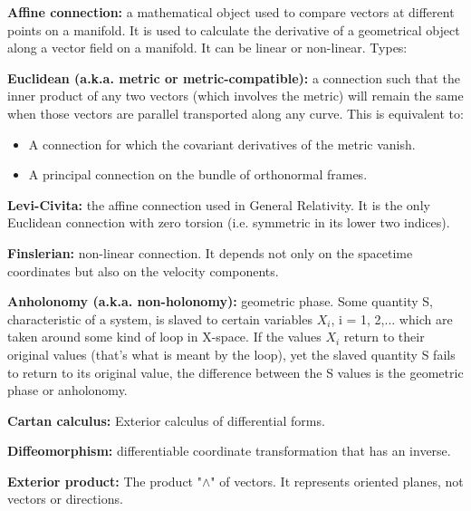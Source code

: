 \begin{list}{}{}
	\item \textbf{Affine connection:} a mathematical object used to compare vectors at different points on a manifold. It is used to calculate the derivative of a geometrical object along a vector field on a manifold. It can be linear or non-linear. Types:
	\begin{list}{}{}
		\item \textbf{Euclidean (a.k.a. metric or metric-compatible):} a connection such that the inner product of any two vectors (which involves the metric) will remain the same when those vectors are parallel transported along any curve. This is equivalent to:
		\begin{itemize}
			\item A connection for which the covariant derivatives of the metric vanish.
			\item A principal connection on the bundle of orthonormal frames.
		\end{itemize}
		
		\item \textbf{Levi-Civita:} the affine connection used in General Relativity. It is the only Euclidean connection with zero torsion (i.e. symmetric in its lower two indices).
		
		\item \textbf{Finslerian:} non-linear connection. It depends not only on the spacetime coordinates but also on the velocity components.
	\end{list}

	\item \textbf{Anholonomy (a.k.a. non-holonomy):} geometric phase. Some quantity S, characteristic of a system, is slaved to certain variables $X_i$, {i = 1, 2,...}
	which are taken around some kind of loop in X-space. If the values $X_i$ return to their original values (that's what is meant by the loop), yet the slaved quantity S fails to return to its original value, the difference between the S values is the geometric phase or anholonomy.
	
	\item \textbf{Cartan calculus:} Exterior calculus of differential forms.

	\item \textbf{Diffeomorphism:} differentiable coordinate transformation that has an inverse.
	
	\item \textbf{Exterior product:} The product "$\wedge$" of vectors. It represents oriented planes, not vectors or directions.
	

\end{list}
